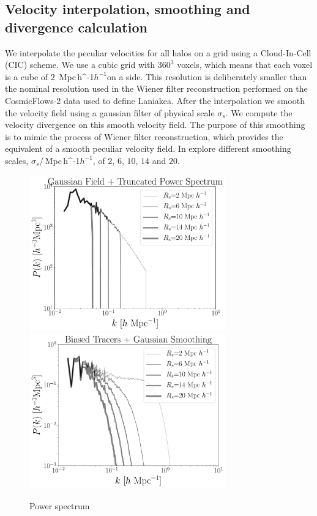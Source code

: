 \documentclass[usenatbib]{mnras}
\newcommand{\Mpch}{\,{\rm Mpc}\,\ifmmode h^{-1}\else $h^{-1}$\fi}
\begin{document}
\subsection{Velocity interpolation, smoothing and divergence calculation}  

We interpolate the peculiar velocities for all halos on a grid using a
Cloud-In-Cell (CIC) scheme. 
We use a cubic grid with $360^3$ voxels, which means that each voxel
is a cube of $2$ \Mpch on a side.  
This resolution is deliberately smaller than the nominal resolution
used in the Wiener filter reconstruction performed on the
CosmicFlows-2 data used to define Laniakea. 
After the interpolation we smooth the velocity field using a gaussian
filter of physical scale $\sigma_s$.  
We compute the velocity divergence on this smooth velocity field. 
The purpose of this smoothing is to mimic the process of Wiener filter
reconstruction, which provides the equivalent of a smooth peculiar
velocity field. 
In explore different smoothing scales, $\sigma_s$/\Mpch, of $2$, $6$,
$10$, $14$ and $20$. 



\begin{figure}
    \centering
    \includegraphics[width=240pt]{plot_power_spectrum_field_rs.pdf}
    \includegraphics[width=240pt]{plot_power_spectrum_tracers_rs.pdf}
    \caption{Power spectrum}
    \label{fig:power_spectrum}
\end{figure}
\end{document}
